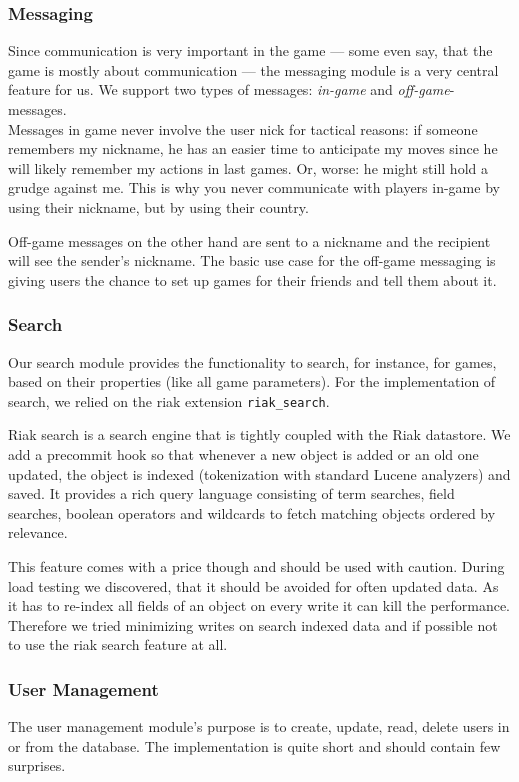 \documentclass[11pt,a4paper]{report}
\begin{document}
\subsubsection{Messaging}
Since communication is very important in the game --- some even say, that the
game is mostly about communication --- the messaging module is a very central
feature for us. We support two types of messages: {\em in-game\/} and
{\em off-game\/}-messages.\\
Messages in game never involve the user nick for tactical reasons: if someone
remembers my nickname, he has an easier time to anticipate my moves since he
will likely remember my actions in last games.
Or, worse: he might still hold a grudge against me. This is why you never
communicate with players in-game by using their nickname, but by using their
country.

Off-game messages on the other hand are sent to a nickname and the recipient
will see the sender's nickname. The basic use case for the off-game messaging
is giving users the chance to set up games for their friends and tell them
about it.
\subsubsection{Search}
Our search module provides the functionality to search, for instance, for
games, based on their properties (like all game parameters). For the
implementation of search, we relied on the riak extension {\tt riak\_search}.

Riak search is a search engine that is tightly coupled with the Riak datastore.
We add a precommit hook so that whenever a new object is added or an old one
updated, the object is indexed (tokenization with standard Lucene analyzers)
and saved.
It provides a rich query language consisting of term searches, field searches,
boolean operators and wildcards to fetch matching objects ordered by relevance.

This feature comes with a price though and should be used with caution.
During load testing we discovered, that it should be avoided for often updated data.
As it has to re-index all fields of an object on every write it can kill the performance.
Therefore we tried minimizing writes on search indexed data and if possible not
to use the riak search feature at all.

\subsubsection{User Management}
The user management module's purpose is to create, update, read, delete users
in or from the database. The implementation is quite short and should contain
few surprises.
\end{document}
